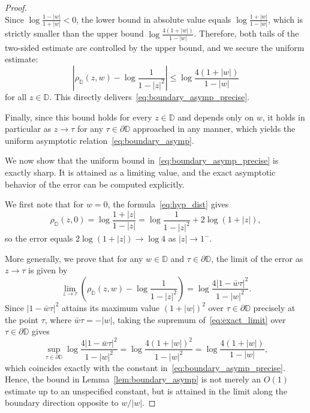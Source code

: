 \documentclass[10pt,a4paper]{amsart}
\numberwithin{equation}{section}
\begin{document}
\begin{proof}
\begin{equation*}
\end{equation*}
Since $\log\frac{1-|w|}{1+|w|} < 0$, the lower bound in absolute value equals $\log\frac{1+|w|}{1-|w|}$, which is strictly smaller than the upper bound $\log\frac{4(1+|w|)}{1-|w|}$. Therefore, both tails of the two-sided estimate are controlled by the upper bound, and we secure the uniform estimate:
\begin{equation*}
\left|\rho_{\mathbb{D}}(z,w) - \log\frac{1}{1-|z|^2}\right| \le \log\frac{4(1+|w|)}{1-|w|}
\end{equation*}
for all $z \in \mathbb{D}$. This directly delivers~\eqref{eq:boundary_asymp_precise}.

Finally, since this bound holds for every $z\in\mathbb{D}$ and depends only on $w$, it holds in particular as $z\to\tau$ for any $\tau\in\partial\mathbb{D}$ approached in any manner, which yields the uniform asymptotic relation~\eqref{eq:boundary_asymp}.


We now show that the uniform bound in~\eqref{eq:boundary_asymp_precise} is exactly sharp. It is attained as a limiting value, and the exact asymptotic behavior of the error can be computed explicitly.

We first note that for $w=0$, the formula~\eqref{eq:hyp_dist} gives
\begin{equation*}
\rho_{\mathbb{D}}(z,0) =\log \frac{1+|z|}{1-|z|}= \log\frac{1}{1-|z|^2} + 2\log(1+|z|),
\end{equation*}
so the error equals $2\log(1+|z|) \to \log 4$ as $|z|\to 1^-$.

More generally, we prove that for any $w\in\mathbb{D}$ and $\tau\in\partial\mathbb{D}$, the limit of the error as $z\to\tau$ is given by
\begin{equation}
\label{eq:exact_limit}
\lim_{z\to\tau}
  \left(\rho_{\mathbb{D}}(z,w) - \log\frac{1}{1-|z|^2}\right)
= \log\frac{4|1-\bar{w}\tau|^2}{1-|w|^2}.
\end{equation}
Since $|1-\bar w\tau|^2$ attains its maximum value $(1+|w|)^2$ over $\tau\in\partial\mathbb{D}$ precisely at the point $\tau$, where $\bar w\tau=-|w|$, taking the supremum of~\eqref{eq:exact_limit} over $\tau\in\partial\mathbb{D}$ gives
\begin{equation*}
\sup_{\tau\in\partial\mathbb{D}}\log\frac{4|1-\bar w\tau|^2}{1-|w|^2} = \log\frac{4(1+|w|)^2}{1-|w|^2} = \log\frac{4(1+|w|)}{1-|w|},
\end{equation*}
which coincides exactly with the constant in~\eqref{eq:boundary_asymp_precise}. Hence, the bound in Lemma~\ref{lem:boundary_asymp} is not merely an $O(1)$ estimate up to an unspecified constant, but is attained in the limit along the boundary direction opposite to $w/|w|$.


\end{proof}
\end{document}
